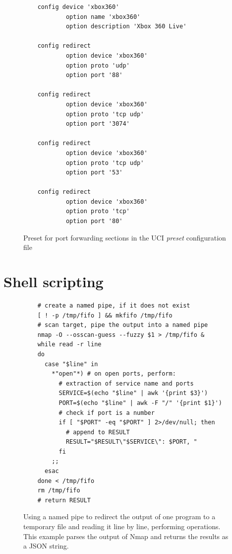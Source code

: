 \documentclass[a4paper,11pt,makeidx]{kth-bcs}
\begin{document}
   \begin{figure}[ht]
      \centering
      \begin{lstlisting}
    config device 'xbox360'
            option name 'xbox360'
            option description 'Xbox 360 Live'

    config redirect
            option device 'xbox360'
            option proto 'udp'
            option port '88'

    config redirect
            option device 'xbox360'
            option proto 'tcp udp'
            option port '3074'

    config redirect
            option device 'xbox360'
            option proto 'tcp udp'
            option port '53'

    config redirect
            option device 'xbox360'
            option proto 'tcp'
            option port '80'
      \end{lstlisting}
      \caption{
         \small{
Preset for port forwarding sections in the UCI \emph{preset} configuration file
         }
      }
      \label{fig:preset_conf}
   \end{figure}

\chapter{Shell scripting}\label{appB}
   \begin{figure}[ht]
      \centering
      \lstset{language=sh}
      \begin{lstlisting}
    # create a named pipe, if it does not exist
    [ ! -p /tmp/fifo ] && mkfifo /tmp/fifo
    # scan target, pipe the output into a named pipe
    nmap -O --osscan-guess --fuzzy $1 > /tmp/fifo &
    while read -r line
    do
      case "$line" in
        *"open"*) # on open ports, perform:
          # extraction of service name and ports
          SERVICE=$(echo "$line" | awk '{print $3}')
          PORT=$(echo "$line" | awk -F "/" '{print $1}')
          # check if port is a number
          if [ "$PORT" -eq "$PORT" ] 2>/dev/null; then
            # append to RESULT
            RESULT="$RESULT\"$SERVICE\": $PORT, "
          fi
        ;;
      esac
    done < /tmp/fifo
    rm /tmp/fifo
    # return RESULT
      \end{lstlisting}
      \caption{
         \small{
Using a named pipe to redirect the output of one program to a temporary file and reading it line by line, performing operations.
This example parses the output of Nmap and returns the results as a JSON string.
         }
      }
      \label{fig:fifo}
   \end{figure}



\end{document}

